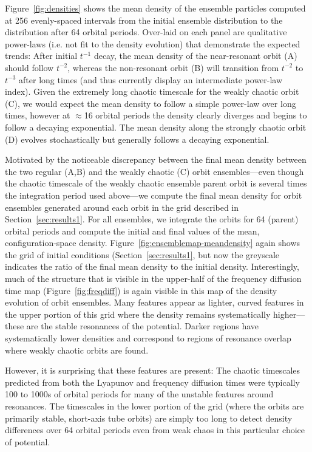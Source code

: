 \documentclass[letterpaper,12pt,preprint]{aastex}
\begin{document}
Figure~\ref{fig:densities} shows the mean density of the ensemble particles computed at 256 evenly-spaced intervals from the initial ensemble distribution to the distribution after 64 orbital periods. Over-laid on each panel are qualitative power-laws (i.e. not fit to the density evolution) that demonstrate the expected trends: After initial $t^{-1}$ decay, the mean density of the near-resonant orbit (A) should follow $t^{-2}$, whereas the non-resonant orbit (B) will transition from $t^{-2}$ to $t^{-3}$ after long times (and thus currently display an intermediate power-law index). Given the extremely long chaotic timescale for the weakly chaotic orbit (C), we would expect the mean density to follow a simple power-law over long times, however at $\approx$16 orbital periods the density clearly diverges and begins to follow a decaying exponential. The mean density along the strongly chaotic orbit (D) evolves stochastically but generally follows a decaying exponential.

Motivated by the noticeable discrepancy between the final mean density between the two regular (A,B) and the weakly chaotic (C) orbit ensembles---even though the chaotic timescale of the weakly chaotic ensemble parent orbit is several times the integration period used above---we compute the final mean density for orbit ensembles generated around each orbit in the grid described in Section~\ref{sec:results1}. For all ensembles, we integrate the orbits for 64 (parent) orbital periods and compute the initial and final values of the mean, configuration-space density. Figure~\ref{fig:ensemblemap-meandensity} again shows the grid of initial conditions (Section~\ref{sec:results1}, but now the greyscale indicates the ratio of the final mean density to the initial density. Interestingly, much of the structure that is visible in the upper-half of the frequency diffusion time map (Figure~\ref{fig:freqdiff}) is again visible in this map of the density evolution of orbit ensembles. Many features appear as lighter, curved features in the upper portion of this grid where the density remains systematically higher---these are the stable resonances of the potential. Darker regions have systematically lower densities and correspond to regions of resonance overlap where weakly chaotic orbits are found. 

However, it is surprising that these features are present: The chaotic timescales predicted from both the Lyapunov and frequency diffusion times were typically 100 to 1000s of orbital periods for many of the unstable features around resonances. The timescales in the lower portion of the grid (where the orbits are primarily stable, short-axis tube orbits) are simply too long to detect density differences over 64 orbital periods even from weak chaos in this particular choice of potential.
\end{document}
